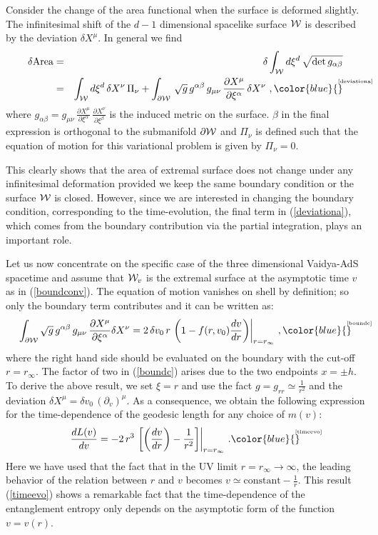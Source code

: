 \documentclass[12pt]{article}
\newcommand{\be}{\begin{equation}}
\newcommand{\ee}{\end{equation}}
\def\req#1{(\ref{#1})}
\def\({\left (}
\def\){\right )}
\def\p{\partial}
\def\s{\sigma}
\def\CW{{\cal W}}
\def\p{\partial}
\def\f#1#2{{\frac{#1}{#2}}}
\def\f#1#2{{\frac{#1}{#2}}}
\def\p{\partial}
\def\Label#1{\label{#1}%
{ \color{blue}{\smash{\hbox to0pt{\raise2ex\hbox{\tiny[#1]}\hss}}}}}
\def\Gms{\CW}
\def\s{\sqrt}
\def\de{\partial}
\def\f {\frac}
\def\ap{\alpha}
\def\no{\nonumber \\}
\def\ba{\begin{eqnarray}}
\def\ea{\end{eqnarray}}
\begin{document}
Consider the change of the area functional when the surface is
deformed slightly. The infinitesimal shift of the $d-1$ dimensional
spacelike surface $\Gms$ is described by the deviation $\delta
X^\mu$. In general we find
%
\ba \delta \mbox{Area} &=&\delta
\int_{\Gms} d\xi^{d} \, \s{\mbox{det} \, g_{\ap\beta}}\no
&=& \int_{\Gms}
d\xi^{d}\, \delta X^\nu \, \Pi_\nu+\int_{\de \Gms}\, \s{g}\,g^{\ap\beta}\,g_{\mu\nu}\,\f{\de X^\mu}{\de \xi^\ap}\,\delta X^\nu\ , \Label{deviationa} \ea
%
where $g_{\ap\beta}=g_{\mu\nu} \, \f{\de X^\mu}{\de \xi^\ap} \, \f{\de X^\nu}{\de \xi^\beta}$
is the induced metric on the surface. $\beta$ in the final expression is orthogonal to the
submanifold $\de \Gms$ and $\Pi_\nu$ is defined such that the equation of motion for this
variational problem is given by $\Pi_\nu=0$.

This clearly shows that the area of extremal surface does not change
under any infinitesimal deformation provided we keep the same
boundary condition or the surface $\Gms$ is closed. However, since we
are interested in changing the boundary condition, corresponding to
the time-evolution, the final term in \req{deviationa}, which comes
from the boundary contribution via the partial integration, plays an
important role.


Let us now concentrate on the specific case of the three dimensional Vaidya-AdS spacetime and assume that $\Gms_{v}$ is the extremal surface at the asymptotic time $v$ as in \req{boundconv}. The equation of motion vanishes on shell by
definition; so only the boundary term contributes and it can be written as:
%
\be
\int_{\de\Gms}\s{g}\, g^{\ap\beta}\, g_{\mu\nu}\, \f{\de X^\mu}{\de
\xi^\ap}\delta X^\nu=2\, \delta v_0\, r\,
\left(1-f(r,v_0)\f{dv}{dr}\right)\biggr|_{r=r_{\infty}} \ ,
\Label{boundc}\ee
%
where the right hand side should be evaluated on the boundary with the cut-off $r=r_{\infty}$. The factor of two in \req{boundc} arises due to the two endpoints $x=\pm h$. To derive the above result, we set $\xi=r$ and use the fact
$g=g_{rr}\simeq \f{1}{r^2}$ and the deviation $\delta X^\mu=\delta
v_0\, \(\p_v\)^\mu$.  As a consequence, we obtain the following expression for the
time-dependence of the geodesic length for any choice of $m(v)$:
%
 \be \f{dL(v)}{d v}=-2\, r^3\,
\left[\left(\f{dv}{dr}\right)-\f{1}{r^2}\right]\biggr|_{r=r_{\infty}} \ .
\Label{timeevo} \ee
%
 Here we have used that the fact that in the UV
limit $r=r_{\infty}\to \infty$, the leading behavior of the relation
between $r$ and $v$ becomes $v\simeq \mbox{constant}-\f{1}{r}$. This
result \req{timeevo} shows a remarkable fact that the
time-dependence of the entanglement entropy only depends on the
asymptotic form of the function $v=v(r)$.
\end{document}
